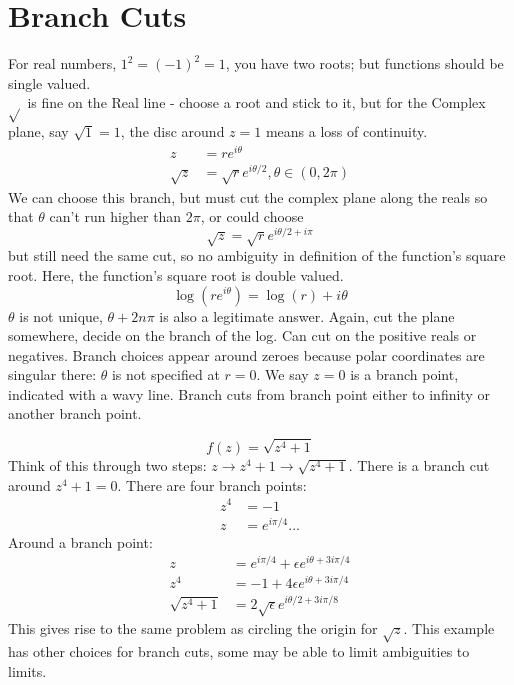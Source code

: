 \documentclass[a4paper, 11pt, normalem]{report}
\begin{document}
\section{Branch Cuts}
For real numbers, $1^2 = (-1)^2 = 1$, you have two roots; but functions should be single valued. \\
$\sqrt{}$ is fine on the Real line - choose a root and stick to it, but for the Complex plane, say $\sqrt{1} = 1$, the disc around $z = 1$ means a loss of continuity. 
\begin{align}
    z &= re^{i\theta} \\
    \sqrt{z} &= \sqrt{r}e^{i\theta/2}, \theta \in (0, 2\pi)
\end{align}
We can choose this branch, but must cut the complex plane along the reals so that $\theta$ can't run higher than $2\pi$, or could choose
\begin{equation}
    \sqrt{z} = \sqrt{r}e^{i\theta/2 +i\pi} 
\end{equation}
but still need the same cut, so no ambiguity in definition of the function's square root. 
Here, the function's square root is double valued.
\begin{equation}
    \log(re^{i\theta}) = \log(r) + i\theta
\end{equation}
$\theta$ is not unique, $\theta + 2n\pi$ is also a legitimate answer. 
Again, cut the plane somewhere, decide on the branch of the log. 
Can cut on the positive reals or negatives. 
Branch choices appear around zeroes because polar coordinates are singular there: $\theta$ is not specified at $r = 0$.
We say $z=0$ is a branch point, indicated with a wavy line. 
Branch cuts from branch point either to infinity or another branch point. 

\begin{example}
\begin{equation}
    f(z) = \sqrt{z^4 + 1}
\end{equation}
Think of this through two steps: $z \to z^4 + 1 \to \sqrt{z^4 + 1}$. 
There is a branch cut around $z^4 + 1 = 0$. 
There are four branch points:
\begin{align}
    z^4 &= -1 \\
    z &= e^{i\pi/4}...
\end{align}
Around a branch point:
\begin{align}
    z &= e^{i\pi/4} + \epsilon e^{i\theta + 3i\pi/4} \\
    z^4 &= -1 + 4\epsilon e^{i\theta +3i\pi/4} \\
    \sqrt{z^4 + 1} &= 2\sqrt{\epsilon}e^{i\theta/2 + 3i\pi/8}
\end{align}
This gives rise to the same problem as circling the origin for $\sqrt{z}$.
This example has other choices for branch cuts, some may be able to limit ambiguities to limits. 
\end{example}
\end{document}
